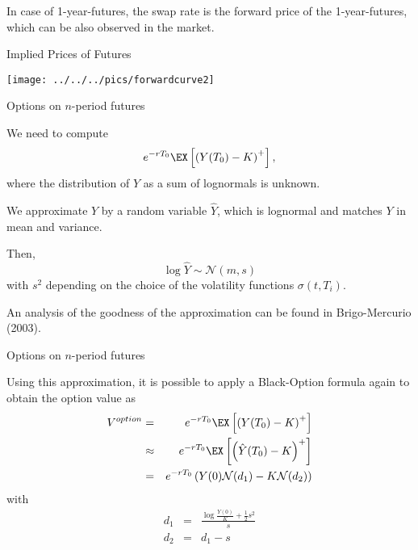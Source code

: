 	In case of 1-year-futures, the swap rate is the forward price of the 1-year-futures,
which can be also observed in the market.







{Implied Prices of Futures}
\begin{center}
\texttt{[image: ../../../pics/forwardcurve2]}
\end{center}





{Options on $n$-period futures}






	We need to compute
$$e^{-rT_0} \EX \left[\left(Y(T_0)-K\right)^+\right],$$
where the distribution of $Y$ as a sum of lognormals is unknown.


	
We approximate $Y$ by a random variable $\hat{Y}$,
which is lognormal and matches $Y$ in mean and variance.


	
Then,
$$\log \hat{Y} \sim \mathcal{N}(m,s)$$
with $s^2$ depending on the choice of the volatility functions
$\sigma(t,T_i)$.


	
An analysis of the goodness of the approximation
can be found in Brigo-Mercurio (2003).








{Options on $n$-period futures}

Using this approximation, it
is possible to apply a Black-Option formula again to obtain the
option value as
\begin{eqnarray}\label{eq:approx-option}
V^{option} & = & e^{-rT_0} \EX \left[\left(Y(T_0)-K\right)^+\right] \nonumber \\
& \approx & e^{-rT_0} \EX \left[\left(\hat{Y}(T_0)-K\right)^+\right]\nonumber \\
& = &  e^{-rT_0} \left(Y(0)\mathcal{N}(d_1)-K\mathcal{N}(d_2)\right)
\end{eqnarray}
with
\begin{eqnarray*}
d_1& = & \frac{\log \frac{Y(0)}{K}+\frac{1}{2}s^2}{s}\\
d_2 & = & d_1 - s
\end{eqnarray*}



